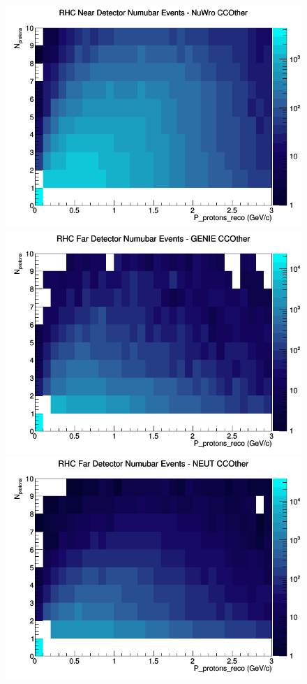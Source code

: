 \documentclass[12pt]{article}
\begin{document}
\begin{figure}[h]
\includegraphics[width=\linewidth]{eff_N_P/GAr/protons/CCOther_RHC_ND_numubar_N_P_NuWro.png}
\endminipage
\newline
{}
\includegraphics[width=\linewidth]{eff_N_P/GAr/protons/CCOther_RHC_FD_numubar_N_P_GENIE.png}
\endminipage
{}
\includegraphics[width=\linewidth]{eff_N_P/GAr/protons/CCOther_RHC_FD_numubar_N_P_NEUT.png}

\end{figure}
\end{document}
